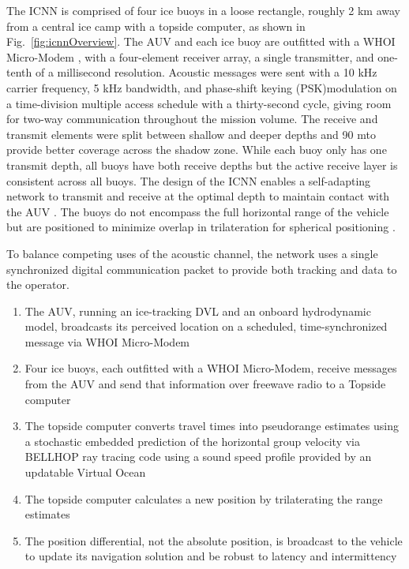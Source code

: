 The ICNN is comprised of four ice buoys in a loose rectangle, roughly 2 km away from a central ice camp with a topside computer, as shown in Fig.~\ref{fig:icnnOverview}.
The AUV and each ice buoy are outfitted with a WHOI Micro-Modem \citep{Singh2006}, with a four-element receiver array, a single transmitter, and one-tenth of a millisecond resolution.
Acoustic messages were sent with a 10 kHz carrier frequency, 5 kHz bandwidth, and phase-shift keying (PSK)modulation on a time-division multiple access schedule with a thirty-second cycle, giving room for two-way communication throughout the mission volume.
The receive and transmit elements were split between shallow and deeper depths and 90 m\textemdash to provide better coverage across the shadow zone.
While each buoy only has one transmit depth, all buoys have both receive depths but the active receive layer is consistent across all buoys. 
The design of the ICNN enables a self-adapting network to transmit and receive at the optimal depth to maintain contact with the AUV \citep{Schneider2020}.
The buoys do not encompass the full horizontal range of the vehicle but are positioned to minimize overlap in trilateration for spherical positioning \citep{Deffenbaugh1996}.

To balance competing uses of the acoustic channel, the network uses a single synchronized digital communication packet to provide both tracking and data to the operator.
\begin{enumerate}
\item The AUV, running an ice-tracking DVL and an onboard hydrodynamic model, broadcasts its perceived location on a scheduled, time-synchronized message via WHOI Micro-Modem
\item Four ice buoys, each outfitted with a WHOI Micro-Modem, receive messages from the AUV and send that information over freewave radio to a Topside computer
\item The topside computer converts travel times into pseudorange estimates using a stochastic embedded prediction of the horizontal group velocity via BELLHOP ray tracing code \citep{Porter2011} using a sound speed profile provided by an updatable Virtual Ocean \citep{Schneider2018,bhatt_embedded_2022}
\item The topside computer calculates a new position by trilaterating the range estimates
\item The position differential, not the absolute position, is broadcast to the vehicle to update its navigation solution and be robust to latency and intermittency
\end{enumerate}

